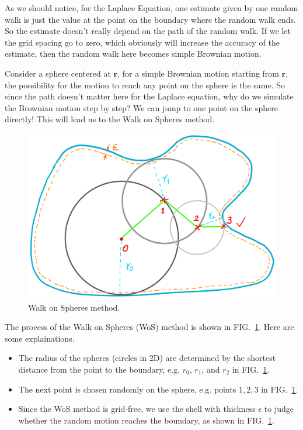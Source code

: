 \documentclass[aps, prl, preprint, groupedaddress]{revtex4-1}
\begin{document}
As we should notice, for the Laplace Equation, one estimate given by one random walk is just the value at the point on the boundary where the random walk ends. So the estimate doesn't really depend on the path of the random walk. If we let the grid spacing go to zero, which obviously will increase the accuracy of the estimate, then the random walk here becomes simple Brownian motion.

Consider a sphere centered at $\bm{r}$, for a simple Brownian motion starting from $\bm{r}$, the possibility for the motion to reach any point on the sphere is the same. So since the path doesn't matter here for the Laplace equation, why do we simulate the Brownian motion step by step? We can jump to one point on the sphere directly! This will lead us to the Walk on Spheres method.

\begin{figure}[htbp]
    \centering
    \includegraphics[width=.8\textwidth]{./figs/wos}
    \caption{\label{fig:wos} Walk on Spheres method.}
\end{figure}

The process of the Walk on Spheres (WoS) method is shown in FIG.~\ref{fig:wos}. Here are some explainations.
\begin{itemize}
    \item The radius of the spheres (circles in 2D) are determined by the shortest distance from the point to the boundary, e.g. $r_0$, $r_1$, and $r_2$ in FIG.~\ref{fig:wos}.
    \item The next point is chosen randomly on the sphere, e.g. points $1, 2, 3$ in FIG.~\ref{fig:wos}.
    \item Since the WoS method is grid-free, we use the shell with thickness $\epsilon$ to judge whether the random motion reaches the boundary, as shown in FIG.~\ref{fig:wos}.
\end{itemize}
\end{document}
